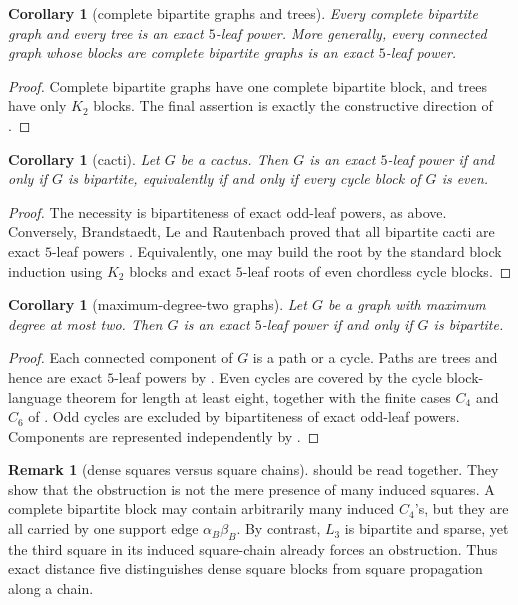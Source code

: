 \documentclass[11pt]{article}
\newtheorem{corollary}[theorem]{Corollary}
\theoremstyle{definition}
\newtheorem{remark}[theorem]{Remark}
\begin{document}
\begin{corollary}[complete bipartite graphs and trees]\label{cor:complete-bipartite-trees}
Every complete bipartite graph and every tree is an exact $5$-leaf power.  More generally, every connected graph whose blocks are complete bipartite graphs is an exact $5$-leaf power.
\end{corollary}

\begin{proof}
Complete bipartite graphs have one complete bipartite block, and trees have only $K_2$ blocks.  The final assertion is exactly the constructive direction of .
\end{proof}

\begin{corollary}[cacti]\label{cor:cacti}
Let $G$ be a cactus.  Then $G$ is an exact $5$-leaf power if and only if $G$ is bipartite, equivalently if and only if every cycle block of $G$ is even.
\end{corollary}

\begin{proof}
The necessity is bipartiteness of exact odd-leaf powers, as above.  Conversely, Brandstaedt, Le and Rautenbach proved that all bipartite cacti are exact $5$-leaf powers \cite[Corollary~4]{BLR2010}.  Equivalently, one may build the root by the standard block induction using $K_2$ blocks and exact $5$-leaf roots of even chordless cycle blocks.
\end{proof}

\begin{corollary}[maximum-degree-two graphs]\label{cor:max-degree-two}
Let $G$ be a graph with maximum degree at most two.  Then $G$ is an exact $5$-leaf power if and only if $G$ is bipartite.
\end{corollary}

\begin{proof}
Each connected component of $G$ is a path or a cycle.  Paths are trees and hence are exact $5$-leaf powers by .  Even cycles are covered by the cycle block-language theorem for length at least eight, together with the finite cases $C_4$ and $C_6$ of \cite[Lemma~6]{BLR2010}.  Odd cycles are excluded by bipartiteness of exact odd-leaf powers.  Components are represented independently by .
\end{proof}

\begin{remark}[dense squares versus square chains]
 should be read together.  They show that the obstruction is not the mere presence of many induced squares.  A complete bipartite block may contain arbitrarily many induced $C_4$'s, but they are all carried by one support edge $\alpha_B\beta_B$.  By contrast, $L_3$ is bipartite and sparse, yet the third square in its induced square-chain already forces an obstruction.  Thus exact distance five distinguishes dense square blocks from square propagation along a chain.
\end{remark}
\end{document}
